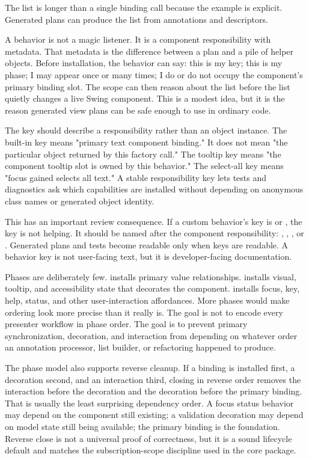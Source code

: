 The list is longer than a single binding call because the example is explicit.
Generated plans can produce the list from annotations and descriptors.

A behavior is not a magic listener. It is a component responsibility with
metadata. That metadata is the difference between a plan and a pile of helper
objects. Before installation, the behavior can say: this is my key; this is my
phase; I may appear once or many times; I do or do not occupy the component's
primary binding slot. The scope can then reason about the list before the list
quietly changes a live Swing component. This is a modest idea, but it is the
reason generated view plans can be safe enough to use in ordinary code.

The key should describe a responsibility rather than an object instance. The
built-in  key means "primary text
component binding." It does not mean "the particular object returned by this
factory call." The tooltip key means "the component tooltip slot is owned by
this behavior." The select-all key means "focus gained selects all text." A
stable responsibility key lets tests and diagnostics ask which capabilities are
installed without depending on anonymous class names or generated object
identity.

This has an important review consequence. If a custom behavior's key is
 or , the key is not helping. It
should be named after the component responsibility: ,
, , or
. Generated plans and tests become readable only
when keys are readable. A behavior key is not user-facing text, but it is
developer-facing documentation.

Phases are deliberately few.  installs primary value
relationships.  installs visual, tooltip, and
accessibility state that decorates the component. 
installs focus, key, help, status, and other user-interaction affordances. More
phases would make ordering look more precise than it really is. The goal is not
to encode every presenter workflow in phase order. The goal is to prevent
primary synchronization, decoration, and interaction from depending on whatever
order an annotation processor, list builder, or refactoring happened to
produce.

The phase model also supports reverse cleanup. If a binding is installed first,
a decoration second, and an interaction third, closing in reverse order removes
the interaction before the decoration and the decoration before the primary
binding. That is usually the least surprising dependency order. A focus status
behavior may depend on the component still existing; a validation decoration
may depend on model state still being available; the primary binding is the
foundation. Reverse close is not a universal proof of correctness, but it is a
sound lifecycle default and matches the subscription-scope discipline used in
the core package.

